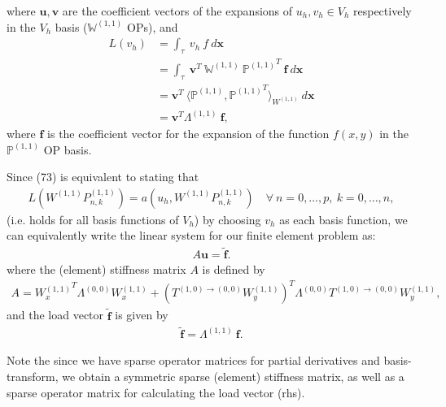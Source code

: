 \documentclass[11pt, oneside]{article}   	%
\newcommand{\Wii}{W^{(1,1)}}
\newcommand{\Pii}{P^{(1,1)}}
\newcommand{\bigPii}{{\mathbb{P}^{(1,1)}}}
\newcommand{\element}{\tau}
\newcommand{\bigWii}{{\mathbb{W}^{(1,1)}}}
\begin{document}
where $\mathbf{u}, \mathbf{v}$ are the coefficient vectors of the expansions of $u_h, v_h \in V_h$ respectively in the $V_h$ basis ($\bigWii$ OPs), and
\begin{align}
	L(v_h) &= \int_\element \: v_h \: f \: d\mathbf{x} \\
	&= \int_\element \: \mathbf{v}^T \: \bigWii \: \bigPii^T \: \mathbf{f} \: d\mathbf{x} \\
	&= \mathbf{v}^T \: \langle \bigPii, {\bigPii}^T \rangle_{\Wii} \: d\mathbf{x} \\
	&= \mathbf{v}^T \Lambda^{(1,1)} \: \mathbf{f},
\end{align}
where $\mathbf{f}$ is the coefficient vector for the expansion of the function $f(x,y)$ in the $\bigPii$ OP basis.

Since (73) is equivalent to stating that
\begin{align}
	L(\Wii \Pii_{n,k}) = a(u_h,\Wii \Pii_{n,k}) \quad \forall \: n = 0,\dots,p, \: k = 0,\dots,n,
\end{align}
(i.e. holds for all basis functions of $V_h$) by choosing $v_h$ as each basis function, we can equivalently write the linear system for our finite element problem as:
\begin{align}
A\mathbf{u} = \tilde{\mathbf{f}}.
\end{align}
where the (element) stiffness matrix $A$ is defined by 
\begin{align}
A = {\Wii_x}^T \Lambda^{(0,0)} \Wii_x + ({T^{(1,0)\to(0,0)} \Wii_y})^T \Lambda^{(0,0)} T^{(1,0)\to(0,0)} \Wii_y, 
\end{align}
and the load vector $\tilde{\mathbf{f}}$ is given by 
\begin{align}
\tilde{\mathbf{f}} = \Lambda^{(1,1)} \: \mathbf{f}.
\end{align}

Note the since we have sparse operator matrices for partial derivatives and basis-transform, we obtain a symmetric sparse (element) stiffness matrix, as well as a sparse operator matrix for calculating the load vector (rhs).
\end{document}
